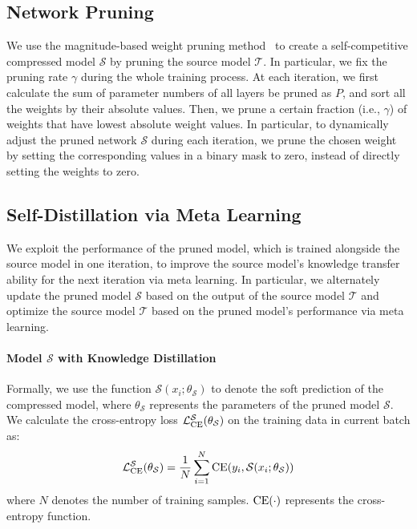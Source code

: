 \documentclass[11pt]{article}
\begin{document}
\subsection{Network Pruning}
We use the magnitude-based weight pruning method~\citep{han2015deep,zhu2017prune} to create a self-competitive compressed model $\mathcal{S}$ by pruning the source model $\mathcal{T}$. In particular, 
we fix the pruning rate $\gamma$ during the whole training process. At each iteration, we first calculate the sum of parameter numbers of all layers be pruned as $P$, and sort all the weights by their absolute values. Then, we prune a certain fraction (i.e., $\gamma$) of weights that have lowest absolute weight values. In particular, to dynamically adjust the pruned network $\mathcal{S}$ during each iteration, we prune the chosen weight by setting the corresponding values in a binary mask to zero, instead of directly setting the weights to zero. 

\subsection{Self-Distillation via Meta Learning}
We exploit the performance of the pruned model, which is trained alongside the source model in one iteration, to improve the source model's knowledge transfer ability for the next iteration via meta learning. 
In particular, we alternately update the pruned model $\mathcal{S}$ based on the output of the source model $\mathcal{T}$ and optimize the source model $\mathcal{T}$ based on the pruned model's performance via meta learning. 

\paragraph{Model $\mathcal{S}$ with Knowledge Distillation}
Formally, we use the function $\mathcal{S}(x_i; \theta_{\mathcal{S}})$ to denote the soft prediction of the compressed model, where $\theta_{\mathcal{S}}$ represents the parameters of the pruned model $\mathcal{S}$. We calculate the cross-entropy loss $\mathcal{L}^{\mathcal{S}}_{\rm CE}(\theta_{\mathcal{S}})$ on the training data in current batch as:
\begin{equation}
\mathcal{L}^{\mathcal{S}}_{\rm CE}(\theta_{\mathcal{S}})= \frac{1}{N}\sum_{i=1}^{N}{\rm CE}(y_i, \mathcal{S}(x_i; \theta_{\mathcal{S}}))
\end{equation}
where $N$ denotes the number of training samples. ${\rm CE(\cdot)}$ represents the cross-entropy function. 
\end{document}
